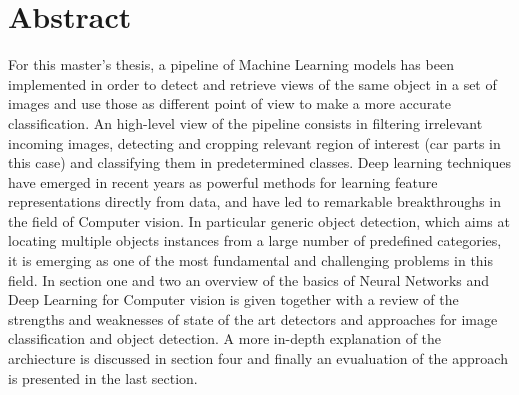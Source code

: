 

\chapter*{Abstract}
For this master's thesis, a pipeline of Machine Learning models has been implemented in order to detect and retrieve views of the same object in a set of images and use those as different point of view to make a more accurate classification. An high-level view of the pipeline consists in filtering irrelevant incoming images, detecting and cropping relevant region of interest (car parts in this case) and classifying them in predetermined classes. Deep learning techniques have emerged in recent years as powerful methods for learning feature representations directly from data, and have led to remarkable breakthroughs in the field of Computer vision. In particular generic object detection, which aims at locating multiple objects instances from a large number of predefined categories, it is emerging as one of the most fundamental and challenging problems in this field. 
In section one and two an overview of the basics of Neural Networks and Deep Learning for Computer vision is given together with a review of the strengths and weaknesses of state of the art detectors and approaches for image classification and object detection. A more in-depth explanation of the archiecture is discussed in section four and finally an evualuation of the approach is presented in the last section.

 




